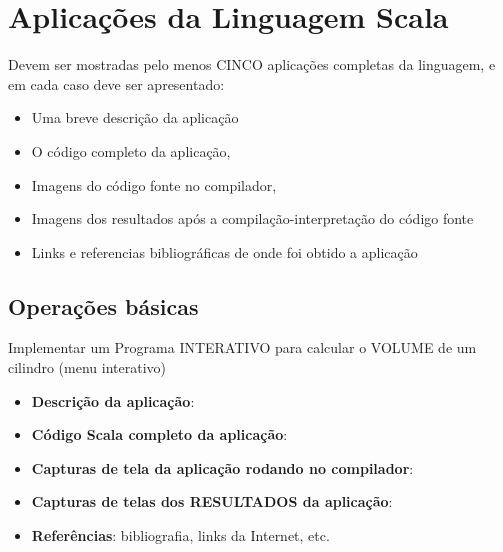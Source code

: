 


\chapter{ Aplica\c{c}\~{o}es da Linguagem Scala}

Devem ser mostradas pelo menos CINCO aplica\c{c}\~{o}es completas da linguagem, e em cada caso deve ser apresentado:
\begin{itemize}
  \item Uma breve descri\c{c}\~{a}o da aplica\c{c}\~{a}o
  \item O c\'{o}digo completo da aplica\c{c}\~{a}o,
  \item Imagens do c\'{o}digo fonte no compilador,
  \item Imagens dos resultados ap\'{o}s a compila\c{c}\~{a}o-interpreta\c{c}\~{a}o do c\'{o}digo fonte
  \item Links e referencias bibliogr\'{a}ficas de onde foi obtido a aplica\c{c}\~{a}o
\end{itemize}



    \section{Opera\c{c}\~{o}es b\'{a}sicas}
    Implementar um Programa INTERATIVO para calcular o VOLUME de um cilindro (menu interativo)
    \begin{itemize}
      \item \textbf{Descri\c{c}\~{a}o da aplica\c{c}\~{a}o}:
      \item \textbf{C\'{o}digo Scala completo da aplica\c{c}\~{a}o}:
      \item \textbf{Capturas de tela da aplica\c{c}\~{a}o rodando no compilador}:
      \item \textbf{Capturas de telas dos RESULTADOS da aplica\c{c}\~{a}o}:
      \item \textbf{Refer\^{e}ncias}: bibliografia, links da Internet, etc.
    \end{itemize}




